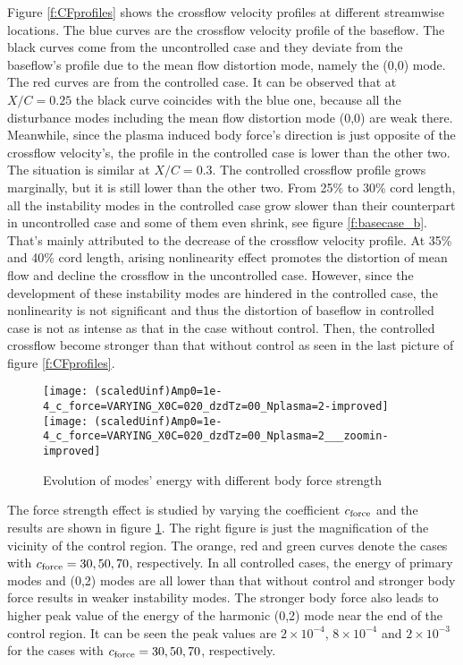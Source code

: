 \documentclass{AIAA}
\begin{document}
Figure \ref{f:CFprofiles} shows the crossflow velocity profiles at different streamwise locations. The blue curves are the crossflow velocity profile of the baseflow. The black curves come from the uncontrolled case and they deviate from the baseflow's profile due to the mean flow distortion mode, namely the (0,0) mode. The red curves are from the controlled case. It can be observed that at $X/C=0.25$ the black curve coincides with the blue one, because all the disturbance modes including the mean flow distortion mode (0,0) are weak there. Meanwhile, since the plasma induced body force's direction is just opposite of the crossflow velocity's, the profile in the controlled case is lower than the other two. The situation is similar at $X/C=0.3$. The controlled crossflow profile grows marginally, but it is still lower than the other two. From 25\% to 30\% cord length, all the instability modes in the controlled case grow slower than their counterpart in uncontrolled case and some of them even shrink, see figure \ref{f:basecase_b}. That's mainly attributed to the decrease of the crossflow velocity profile. At 35\% and 40\% cord length, arising nonlinearity effect promotes the distortion of mean flow and decline the crossflow in the uncontrolled case. However, since the development of these instability modes are hindered in the controlled case, the nonlinearity is not significant and thus the distortion of baseflow in controlled case is not as intense as that in the case without control. Then, the controlled crossflow become stronger than that without control as seen in the last picture of figure \ref{f:CFprofiles}.
\begin{figure}
\centering
\texttt{[image: (scaledUinf)Amp0=1e-4\_c\_force=VARYING\_X0C=020\_dzdTz=00\_Nplasma=2-improved]}
\texttt{[image: (scaledUinf)Amp0=1e-4\_c\_force=VARYING\_X0C=020\_dzdTz=00\_Nplasma=2\_\_\_zoomin-improved]}
\caption{Evolution of modes' energy with different body force strength}%
\label{f:forcestrength}
\end{figure}

The force strength effect is studied by varying the coefficient $c_{\rm force}$ and the results are shown in figure \ref{f:forcestrength}. The right figure is just the magnification of the vicinity of the control region. The orange, red and green curves denote the cases with $c_{\rm force}=30,50,70$, respectively. In all controlled cases, the energy of primary modes and (0,2) modes are all lower than that without control and stronger body force results in weaker instability modes. The stronger body force also leads to higher peak value of the energy of the harmonic (0,2) mode near the end of the control region. It can be seen the peak values are $2 \times 10^{-4}$, $8 \times 10^{-4}$ and  $2 \times 10^{-3}$ for the cases with $c_{\rm force}=30,50,70$, respectively. 
\end{document}
